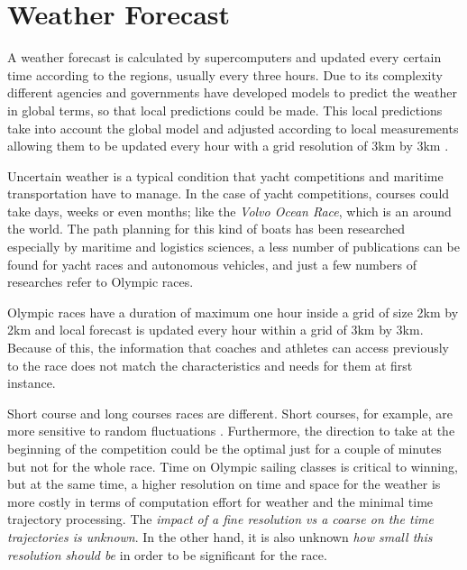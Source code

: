 \section{Weather Forecast}
A weather forecast is calculated by supercomputers and updated every certain time according to the regions, usually every three hours. Due to its complexity different agencies and governments have developed models to predict the weather in global terms, so that local predictions could be made. This local predictions take into account the global model and adjusted according to local measurements allowing them to be updated every hour with a grid resolution of 3km by 3km \cite{warner2010numerical}. \par

Uncertain weather is a typical condition that yacht competitions and maritime transportation have to manage. In the case of yacht competitions, courses could take days, weeks or even months; like the \textit{Volvo Ocean Race}, which is an around the world. The path planning for this kind of boats has been researched especially by maritime and logistics sciences, a less number of publications can be found for yacht races and autonomous vehicles, and just a few numbers of researches refer to Olympic races. \par  

 Olympic races have a duration of maximum one hour inside a grid of size 2km by 2km and local forecast is updated every hour within a grid of 3km by 3km. Because of this, the information that coaches and athletes can access previously to the race does not match the characteristics and needs for them at first instance.\par
 Short course and long courses races are different. Short courses, for example, are more sensitive to random fluctuations \cite{philpott2001optimising}. Furthermore, the direction to take at the beginning of the competition could be the optimal just for a couple of minutes but not for the whole race. Time on Olympic sailing classes is critical to winning, but at the same time, a higher resolution on time and space for the weather is more costly in terms of computation effort for weather and the minimal time trajectory processing. The \textit{impact of a fine resolution vs a coarse on the time trajectories is unknown}. In the other hand, it is also unknown \textit{how small this resolution should be} in order to be significant for the  race.\par
 
